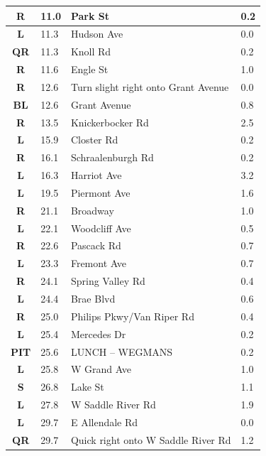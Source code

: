 \documentclass[11pt]{article}
\begin{document}
\begin{center}
\begin{supertabular}{|c|p{0.30in}|p{2.25in}|l|}
 \textbf{R} &  11.0 & Park St &   0.2 \\ \hline
 \textbf{L} &  11.3 & Hudson Ave &   0.0 \\ \hline
{} \textbf{QR} &  11.3 & Knoll Rd &   0.2 \\ \hline
{} \textbf{R} &  11.6 & Engle St &   1.0 \\ \hline
{} \textbf{R} &  12.6 & Turn slight right onto Grant Avenue &   0.0 \\ \hline
 \textbf{BL} &  12.6 & Grant Avenue &   0.8 \\ \hline
{} \textbf{R} &  13.5 & Knickerbocker Rd &   2.5 \\ \hline
 \textbf{L} &  15.9 & Closter Rd &   0.2 \\ \hline
{} \textbf{R} &  16.1 & Schraalenburgh Rd &   0.2 \\ \hline
 \textbf{L} &  16.3 & Harriot Ave &   3.2 \\ \hline
 \textbf{L} &  19.5 & Piermont Ave &   1.6 \\ \hline
{} \textbf{R} &  21.1 & Broadway &   1.0 \\ \hline
 \textbf{L} &  22.1 & Woodcliff Ave &   0.5 \\ \hline
{} \textbf{R} &  22.6 & Pascack Rd &   0.7 \\ \hline
 \textbf{L} &  23.3 & Fremont Ave &   0.7 \\ \hline
{} \textbf{R} &  24.1 & Spring Valley Rd &   0.4 \\ \hline
 \textbf{L} &  24.4 & Brae Blvd &   0.6 \\ \hline
{} \textbf{R} &  25.0 & Philips Pkwy/\hspace{0pt}Van Riper Rd &   0.4 \\ \hline
 \textbf{L} &  25.4 & Mercedes Dr &   0.2 \\ \hline
{} \textbf{PIT} &  25.6 & LUNCH -- WEGMANS &   0.2 \\ \hline
 \textbf{L} &  25.8 & W Grand Ave &   1.0 \\ \hline
 \textbf{S} &  26.8 & Lake St &   1.1 \\ \hline
 \textbf{L} &  27.8 & W Saddle River Rd &   1.9 \\ \hline
 \textbf{L} &  29.7 & E Allendale Rd &   0.0 \\ \hline
{} \textbf{QR} &  29.7 & Quick right onto W Saddle River Rd &   1.2 \\ \hline

\end{supertabular}
\end{center}
\end{document}
